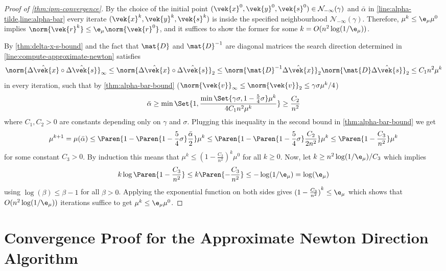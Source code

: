 \begin{proof}[Proof of \cref{thm:ipm-convergence}]
  By the choice of the initial point \((\vek{x}^0, \vek{y}^0, \vek{s}^0) \in \mathcal{N}_{-\infty}(\gamma)\) and \(\bar{\alpha}\) in \cref{line:alpha-tilde,line:alpha-bar} every iterate \((\vek{x}^k, \vek{y}^k, \vek{s}^k)\) is inside the specified neighbourhood \(\mathcal{N}_{-\infty}(\gamma)\).
  Therefore, \(\mu^k \leq \e_\mu \mu^0\) implies \(\norm{\vek{r}^k} \leq \e_\mu \norm{\vek{r}^0}\), and it suffices to show the former for some \(k = O(n^2 \log(1/\e_\mu))\).

  By \cref{thm:delta-x-s-bound} and the fact that \(\mat{D}\) and \(\mat{D}^{-1}\) are diagonal matrices the search direction determined in \cref{line:compute-approximate-newton} satisfies
  \[ \norm{\hat{\Delta\vek{x}} \circ \hat{\Delta\vek{s}}}_\infty \leq \norm{\hat{\Delta\vek{x}} \circ \hat{\Delta\vek{s}}}_2 \leq \norm{\mat{D}^{-1}\hat{\Delta\vek{x}}}_2 \norm{\mat{D}\hat{\Delta\vek{s}}}_2 \leq C_1 n^2 \mu^k\]
  in every iteration, such that by \cref{thm:alpha-bar-bound} (\(\norm{\vek{v}}_\infty \leq \norm{\vek{v}}_2 \leq \gamma \sigma \mu^k/4\))
  \[ \bar{\alpha} \geq \min \Set{1, \frac{\min \Set{\gamma \sigma, 1 - \frac{5}{4}\sigma} \mu^k}{4 C_1 n^2 \mu^k}} \geq \frac{C_2}{n^2} \]
  where \(C_1, C_2 > 0\) are constants depending only on \(\gamma\) and \(\sigma\).
  Plugging this inequality in the second bound in \cref{thm:alpha-bar-bound} we get
  \[ \mu^{k+1} = \mu(\bar{\alpha}) \leq \Paren{ 1 - \Paren{1 - \frac{5}{4} \sigma} \frac{\bar{\alpha}}{2}} \mu^k \leq \Paren{ 1 - \Paren{1 - \frac{5}{4} \sigma} \frac{C_2}{2 n^2}} \mu^k \leq \Paren{1 - \frac{C_3}{n^2}} \mu^k \]
  for some constant \(C_3 > 0\).
  By induction this means that \(\mu^k \leq {(1 - \frac{C_3}{n^2})}^k \mu^0\) for all \(k \geq 0\).
  Now, let \(k \geq n^2 \log(1/\e_\mu) / C_3\) which implies
  \[ k \log\Paren{1 - \frac{C_3}{n^2}} \leq k \Paren{- \frac{C_3}{n^2}} \leq -\log(1/\e_\mu) = \log(\e_\mu) \]
  using \(\log(\beta) \leq \beta-1\) for all \(\beta > 0\).
  Applying the exponential function on both sides gives \({(1 - \frac{C_3}{n^2})}^k \leq \e_\mu\) which shows that \(O(n^2 \log(1/\e_\mu))\) iterations suffice to get \(\mu^k \leq \e_\mu \mu^0\).
\end{proof}

\section{Convergence Proof for the Approximate Newton Direction Algorithm}

